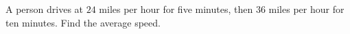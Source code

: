 A person drives at $24$ miles per hour for five minutes, then $36$ miles per hour for ten minutes. Find the average speed.
